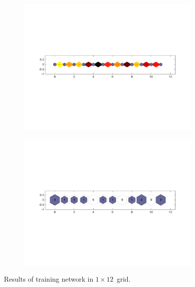     \begin{figure}
        \begin{subfigure}[b]{0.5\textwidth}
            \centering
            \includegraphics[width=\textwidth]{../images/1d/apps/dist_1_by_12.png}
        \end{subfigure}
        \hfill
        \begin{subfigure}[b]{0.5\textwidth}
             \includegraphics[width=\textwidth]{../images/1d/apps/hit_t_1_by_12.png}
        \end{subfigure}
                \caption{Results of training network in $1\times12$~grid.}
         \label{fig: 1by12T}
    \end{figure}

